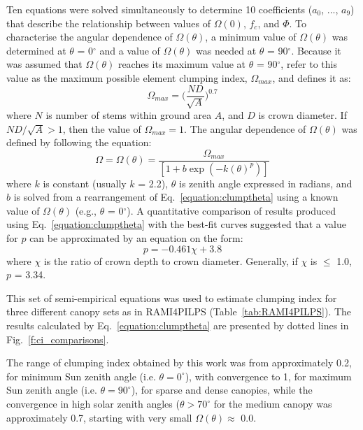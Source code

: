 \documentclass[a4paper,11pt]{report}
\begin{document}
Ten equations were solved simultaneously to determine 10 coefficients ($a_0$, ..., $a_9$) that describe the relationship between values of $\Omega(0)$, $f_c$, and $\Phi$. To characterise the angular dependence of $\Omega(\theta)$, a minimum value of $\Omega(\theta)$ was determined at $\theta$ = 0$^{\circ}$ and a value of $\Omega(\theta)$ was needed at $\theta$ = 90$^{\circ}$. Because it was assumed that $\Omega(\theta)$ reaches its maximum value at $\theta$ = 90$^{\circ}$, \citet{Kucharik1999} refer to this value as the maximum possible element clumping index, $\Omega_{max}$, and defines it as:
\begin{equation}
\Omega_{max} = \Big(\frac{ND}{\sqrt{A}}\Big)^{0.7}
\label{equation:clumpmax}
\end{equation}
\noindent where $N$ is number of stems within ground area $A$, and $D$ is crown diameter. If $ND/\sqrt{A} > 1$, then the value of $\Omega_{max} = 1$. The angular dependence of $\Omega(\theta)$ was defined by \citet{Kucharik1999} following the equation: 
\begin{equation}
\Omega = \Omega(\theta) = \frac{\Omega_{max}}{[1 + b\exp(-k(\theta)^p)]}
\label{equation:clumptheta}
\end{equation}
\noindent where $k$ is constant (usually $k$ = 2.2), $\theta$ is zenith angle expressed in radians, and $b$ is solved from a rearrangement of Eq.~\ref{equation:clumptheta} using a known value of $\Omega(\theta)$ (e.g., $\theta$ = 0$^{\circ}$). A quantitative comparison of results produced using Eq.~\ref{equation:clumptheta} with the best-fit curves suggested that a value for $p$ can be approximated by an equation on the form:
\begin{equation}
p = -0.461\chi + 3.8
\label{equation:pchi}
\end{equation}
\noindent where $\chi$ is the ratio of crown depth to crown diameter. Generally, if $\chi$ is $\leq$ 1.0, $p$ = 3.34. 

This set of semi-empirical equations was used to estimate clumping index for three different canopy sets as in RAMI4PILPS (Table~\ref{tab:RAMI4PILPS}). The results calculated by Eq.~\ref{equation:clumptheta} are presented by dotted lines in Fig.~\ref{f:ci_comparisons}.

The range of clumping index obtained by this work was from approximately 0.2, for minimum Sun zenith angle (i.e. $\theta = 0^{\circ}$), with convergence to 1, for maximum Sun zenith angle (i.e. $\theta = 90^{\circ}$), for sparse and dense canopies, while the convergence in high solar zenith angles ($\theta > 70^{\circ}$ for the medium canopy was approximately 0.7, starting with very small $\Omega(\theta) \approx$ 0.0.
\end{document}
